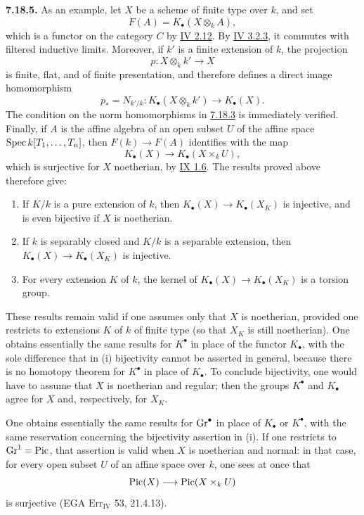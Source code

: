 \textbf{7.18.5.}
As an example, let $X$ be a scheme of finite type over $k$, and set
\[
F(A)=K_\bullet(X\otimes_k A),
\]
which is a functor on the category $C$ by \hyperlink{sga6.e04.para.2-12}{IV 2.12}. By \hyperlink{sga6.e04.para.3-2-3}{IV 3.2.3}, it commutes
with filtered inductive limits. Moreover, if $k'$ is a finite extension of
$k$, the projection
\[
p:X\otimes_k k'\longrightarrow X
\]
is finite, flat, and of finite presentation, and therefore defines a direct
image homomorphism
\[
p_*=N_{k'/k}:K_\bullet(X\otimes_k k')\longrightarrow K_\bullet(X).
\]
The condition on the norm homomorphisms in \hyperlink{sga6.e10.para.7-18-3}{7.18.3} is immediately verified.
Finally, if $A$ is the affine algebra of an open subset $U$ of the affine
space $\operatorname{Spec} k[T_1,\ldots,T_n]$, then $F(k)\to F(A)$ identifies with the map
\[
K_\bullet(X)\longrightarrow K_\bullet(X\times_k U),
\]
which is surjective for $X$ noetherian, by \hyperlink{sga6.e09.prop.1-6}{IX 1.6}. The results proved above
therefore give:
\begin{enumerate}[label=(\roman*)]
\item If $K/k$ is a pure extension of $k$, then
  $K_\bullet(X)\to K_\bullet(X_K)$ is injective, and is even bijective if
  $X$ is noetherian.
\item If $k$ is separably closed and $K/k$ is a separable extension, then
  $K_\bullet(X)\to K_\bullet(X_K)$ is injective.
\item For every extension $K$ of $k$, the kernel of
  $K_\bullet(X)\to K_\bullet(X_K)$ is a torsion group.
\end{enumerate}
These results remain valid if one assumes only that $X$ is noetherian,
provided one restricts to extensions $K$ of $k$ of finite type (so that
$X_K$ is still noetherian). One obtains essentially the same results for
$K^\bullet$ in place of the functor $K_\bullet$, with the sole difference
that in (i) bijectivity cannot be asserted in general, because there is no
homotopy theorem for $K^\bullet$ in place of $K_\bullet$. To conclude
bijectivity, one would have to assume that $X$ is noetherian and regular;
then the groups $K^\bullet$ and $K_\bullet$ agree for $X$ and, respectively,
for $X_K$.

One obtains essentially the same results for $\operatorname{Gr}^\bullet$ in place of
$K_\bullet$ or $K^\bullet$, with the same reservation concerning the
bijectivity assertion in (i). If one restricts to $\operatorname{Gr}^1=\operatorname{Pic}$, that
assertion is valid when $X$ is noetherian and normal: in that case, for every
open subset $U$ of an affine space over $k$, one sees at once that
\[
\operatorname{Pic}(X)\longrightarrow\operatorname{Pic}(X\times_k U)
\]
is surjective (EGA $\mathrm{Err}_{\mathrm{IV}}$ 53, 21.4.13).

